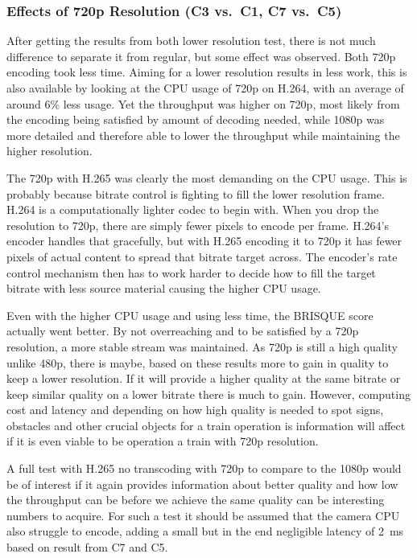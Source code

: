 \subsubsection{Effects of 720p Resolution (C3 vs.\ C1, C7 vs.\ C5)}\label{subsubsec:resolutionDiscussion}

After getting the results from both lower resolution test, there is not much difference to separate it from regular, but some effect was observed. Both 720p encoding took less time. Aiming for a lower resolution results in less work, this is also available by looking at the CPU usage of 720p on H.264, with an average of around 6\% less usage. Yet the throughput was higher on 720p, most likely from the encoding being satisfied by amount of decoding needed, while 1080p was more detailed and therefore able to lower the throughput while maintaining the higher resolution.

The 720p with H.265 was clearly the most demanding on the CPU usage. This is probably because bitrate control is fighting to fill the lower resolution frame. H.264 is a computationally lighter codec to begin with. When you drop the resolution to 720p, there are simply fewer pixels to encode per frame. H.264's encoder handles that gracefully, but with H.265 encoding it to 720p it has fewer pixels of actual content to spread that bitrate target across. The encoder's rate control mechanism then has to work harder to decide how to fill the target bitrate with less source material causing the higher CPU usage.

Even with the higher CPU usage and using less time, the BRISQUE score actually went better. By not overreaching and to be satisfied by a 720p resolution, a more stable stream was maintained. As 720p is still a high quality unlike 480p, there is maybe, based on these results more to gain in quality to keep a lower resolution. If it will provide a higher quality at the same bitrate or keep similar quality on a lower bitrate there is much to gain. However, computing cost and latency and depending on how high quality is needed to spot signs, obstacles and other crucial objects for a train operation is information will affect if it is even viable to be operation a train with 720p resolution.

A full test with H.265 no transcoding with 720p to compare to the 1080p would be of interest if it again provides information about better quality and how low the throughput can be before we achieve the same quality can be interesting numbers to acquire. For such a test it should be assumed that the camera CPU also struggle to encode, adding a small but in the end negligible latency of 2~ms based on result from C7 and C5.

